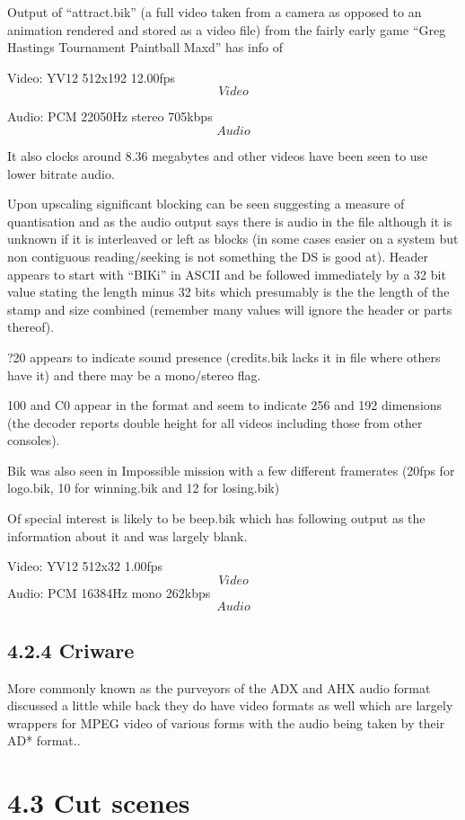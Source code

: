 \documentclass[
]{book}
\begin{document}
Output of ``attract.bik'' (a full video taken from a camera as opposed to an animation rendered and stored as a video file) from the fairly early game ``Greg Hastings Tournament Paintball Maxd'' has info of

Video: YV12 512x192 12.00fps \[Video\]

Audio: PCM 22050Hz stereo 705kbps \[Audio\]

It also clocks around 8.36 megabytes and other videos have been seen to use lower bitrate audio.

Upon upscaling significant blocking can be seen suggesting a measure of quantisation and as the audio output says there is audio in the file although it is unknown if it is interleaved or left as blocks (in some cases easier on a system but non contiguous reading/seeking is not something the DS is good at). Header appears to start with ``BIKi'' in ASCII and be followed immediately by a 32 bit value stating the length minus 32 bits which presumably is the the length of the stamp and size combined (remember many values will ignore the header or parts thereof).

?20 appears to indicate sound presence (credits.bik lacks it in file where others have it) and there may be a mono/stereo flag.

100 and C0 appear in the format and seem to indicate 256 and 192 dimensions (the decoder reports double height for all videos including those from other consoles).

Bik was also seen in Impossible mission with a few different framerates (20fps for logo.bik, 10 for winning.bik and 12 for losing.bik)

Of special interest is likely to be beep.bik which has following output as the information about it and was largely blank.

Video: YV12 512x32 1.00fps \[Video\] Audio: PCM 16384Hz mono 262kbps \[Audio\]

\hypertarget{criware}{%
\subsection{4.2.4 Criware}\label{criware}}

More commonly known as the purveyors of the ADX and AHX audio format discussed a little while back they do have video formats as well which are largely wrappers for MPEG video of various forms with the audio being taken by their AD* format..

\hypertarget{cut-scenes}{%
\section{4.3 Cut scenes}\label{cut-scenes}}
\end{document}
